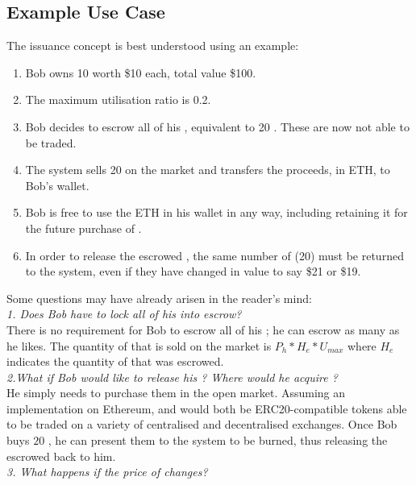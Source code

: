 \subsection{Example Use Case}

\noindent The issuance concept is best understood using an example:
\begin{enumerate}
\item{Bob owns 10 \HAV{} worth \$10 each, total value \$100.}
\item{The maximum utilisation ratio is 0.2.}
\item{Bob decides to escrow all of his \HAV{}, equivalent to 20 \NOM{}. These \HAV{} are now not able to be traded.}
\item{The system sells 20 \NOM{} on the market and transfers the proceeds, in ETH, to Bob's wallet.}
\item{Bob is free to use the ETH in his wallet in any way, including retaining it for the future purchase of \NOM{}.}
\item{In order to release the escrowed \HAV{}, the same number of \NOM{} (20) must be returned to the system, even if they have changed in value to say \$21 or \$19.}
\end{enumerate} 

\noindent Some questions may have already arisen in the reader's mind: \\

\noindent \emph{1. Does Bob have to lock all of his \HAV{} into escrow?} \\ 

\noindent There is no requirement for Bob to escrow all of his \HAV{}; he can escrow as many as he likes. The quantity of \NOM{} that is sold on the market is $ P_h * H_e * U_{max} $ where $H_e$ indicates the quantity of \HAV{} that was escrowed. \\

\noindent \emph{2.What if Bob would like to release his \HAV{}? Where would he acquire \NOM{}?} \\ 

\noindent He simply needs to purchase them in the open market. Assuming an implementation on Ethereum, \HAV{} and \NOM{} would both be ERC20-compatible tokens able to be traded on a variety of centralised and decentralised exchanges. Once Bob buys $20$ \NOM{}, he can present them to the system to be burned, thus releasing the escrowed \HAV{} back to him. \\ 

\noindent \emph{3. What happens if the price of \HAV{} changes?} \\

